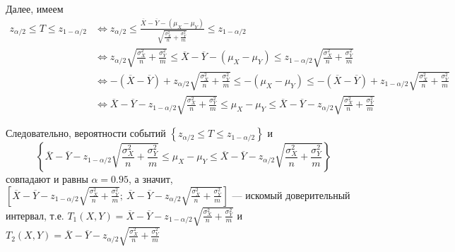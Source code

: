 \documentclass{article}
\begin{document}
Далее, имеем
\begin{equation*}
    \begin{aligned}
        z_{\alpha / 2} \leqslant T \leqslant z_{1-\alpha / 2}&\Longleftrightarrow z_{\alpha / 2} \leqslant \frac{\overline{X}-\overline{Y}-\left(\mu_{X}-\mu_{Y}\right)}{\sqrt{\frac{\sigma_{X}^{2}}{n}+\frac{\sigma_{Y}^{2}}{m}}} \leqslant z_{1-\alpha / 2}\\
        &\Longleftrightarrow z_{\alpha / 2} \sqrt{\frac{\sigma_{X}^{2}}{n}+\frac{\sigma_{Y}^{2}}{m}} \leqslant \overline{X}-\overline{Y}-\left(\mu_{X}-\mu_{Y}\right) \leqslant z_{1-\alpha / 2} \sqrt{\frac{\sigma_{X}^{2}}{n}+\frac{\sigma_{Y}^{2}}{m}}\\
        &\Longleftrightarrow -(\overline{X}-\overline{Y})+z_{\alpha / 2} \sqrt{\frac{\sigma_{X}^{2}}{n}+\frac{\sigma_{Y}^{2}}{m}} \leqslant-\left(\mu_{X}-\mu_{Y}\right) \leqslant-(\overline{X}-\overline{Y})+z_{1-\alpha / 2} \sqrt{\frac{\sigma_{X}^{2}}{n}+\frac{\sigma_{Y}^{2}}{m}}\\
        &\Longleftrightarrow \overline{X}-\overline{Y}-z_{1-\alpha / 2} \sqrt{\frac{\sigma_{X}^{2}}{n}+\frac{\sigma_{Y}^{2}}{m}} \leqslant \mu_{X}-\mu_{Y} \leqslant \overline{X}-\overline{Y}-z_{\alpha / 2} \sqrt{\frac{\sigma_{X}^{2}}{n}+\frac{\sigma_{Y}^{2}}{m}}
    \end{aligned}
\end{equation*}

Следовательно, вероятности событий $\left\{z_{\alpha / 2} \leqslant T \leqslant z_{1-\alpha / 2}\right\}$ и $$\left\{\overline{X}-\overline{Y}-z_{1-\alpha / 2} \sqrt{\frac{\sigma_{X}^{2}}{n}+\frac{\sigma_{Y}^{2}}{m}} \leqslant \mu_{X}-\mu_{Y} \leqslant \overline{X}-\overline{Y}-z_{\alpha / 2} \sqrt{\frac{\sigma_{X}^{2}}{n}+\frac{\sigma_{Y}^{2}}{m}}\right\}$$ совпадают и равны $\alpha=0.95$, а значит, $\left[\overline{X}-\overline{Y}-z_{1-\alpha / 2} \sqrt{\frac{\sigma_{X}^{2}}{n}+\frac{\sigma_{Y}^{2}}{m}};\ \overline{X}-\overline{Y}-z_{\alpha / 2} \sqrt{\frac{\sigma_{X}^{2}}{n}+\frac{\sigma_{Y}^{2}}{m}}\right]$ — искомый доверительный интервал, т.е. $T_{1}(X, Y)=\overline{X}-\overline{Y}-z_{1-\alpha / 2} \sqrt{\frac{\sigma_{X}^{2}}{n}+\frac{\sigma_{Y}^{2}}{m}}$ и $T_{2}(X, Y)=\overline{X}-\overline{Y}-z_{\alpha / 2} \sqrt{\frac{\sigma_{X}^{2}}{n}+\frac{\sigma_{Y}^{2}}{m}}$
\end{document}
